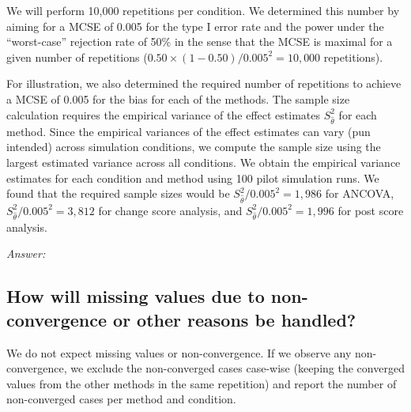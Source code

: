 \documentclass[12pt]{article}
\begin{document}
\begin{examplebox}
We will perform 10,000 repetitions per condition. We determined this number by aiming for a MCSE of 0.005 for the type I error rate and the power under the ``worst-case'' rejection rate of 50\% in the sense that the MCSE is maximal for a given number of repetitions ($0.50 \times (1 - 0.50) / 0.005^2 = 10{,}000$ repetitions).
    
For illustration, we also determined the required number of repetitions to achieve a MCSE of 0.005 for the bias for each of the methods. The sample size calculation requires the empirical variance of the effect estimates $S_{\hat{\theta}}^2$ for each method. Since the empirical variances of the effect estimates can vary (pun intended) across simulation conditions, we compute the sample size using the largest estimated variance across all conditions. We obtain the empirical variance estimates for each condition and method using 100 pilot simulation runs. We found that the required sample sizes would be $S_{\hat{\theta}}^2/0.005^2 = 1{,}986$ for ANCOVA, $S_{\hat{\theta}}^2/0.005^2 = 3{,}812$ for change score analysis, and $S_{\hat{\theta}}^2/0.005^2 = 1{,}996$ for post score analysis.
\end{examplebox}

\textit{Answer:}




\subsection{How will missing values due to non-convergence or other reasons be handled?}
    
    
\begin{examplebox}
We do not expect missing values or non-convergence. If we observe any non-convergence, we exclude the non-converged cases case-wise (keeping the converged values from the other methods in the same repetition) and report the number of non-converged cases per method and condition.
\end{examplebox} 
\end{document}

